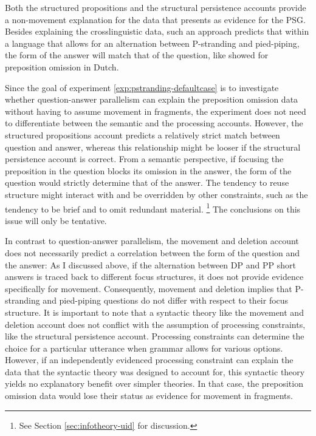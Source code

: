 Both the structured pro\-positions and the structural persistence accounts provide a non-movement explanation for the data that \citet{merchant2001, merchant2004} presents as evidence for the PSG. Besides explaining the crosslinguistic data, such an approach predicts that within a language that allows for an alternation between P-stranding and pied-piping, the form of the answer will match that of the question, like \citet{levelt.kelter1982} showed for preposition omission in Dutch.

Since the goal of experiment \ref{exp:pstranding-defaultcase} is to investigate whether question-answer parallelism can explain the preposition omission data without having to assume movement in fragments, the experiment does not need to differentiate between the semantic and the processing accounts. However, the structured propositions account predicts a relatively strict match between question and answer, whereas this relationship might be looser if the structural persistence account is correct. From a semantic perspective, if focusing the preposition in the question blocks its omission in the answer, the form of the question would strictly determine that of the answer. The tendency to reuse structure might interact with and be overridden by other constraints, such as the tendency to be brief and to omit redundant material.%
%
\footnote{See Section \ref{sec:infotheory-uid} for discussion.}\afterfn%
%
The conclusions on this issue will only be tentative.\largerpage

In contrast to question-answer parallelism, the movement and deletion account does not necessarily predict a correlation between the form of the question and the answer: As I discussed above, if the alternation between DP and PP short answers is traced back to different focus structures, it does not provide evidence specifically for movement. Consequently, movement and deletion implies that P-stranding and pied-piping questions do not differ with respect to their focus structure. It is important to note that a syntactic theory like the movement and deletion account does not conflict with the assumption of processing constraints, like the structural persistence account. Processing constraints can determine the choice for a particular utterance when grammar allows for various options. However, if an independently evidenced processing constraint can explain the data that the syntactic theory was designed to account for, this syntactic theory yields no explanatory benefit over simpler theories. In that case, the preposition omission data would lose their status as evidence for movement in fragments.

